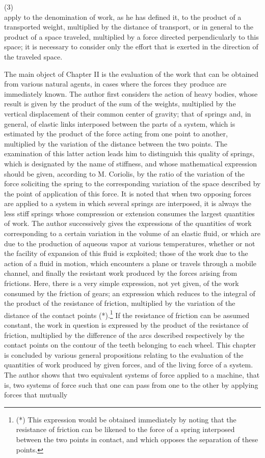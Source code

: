 \documentclass{book}
\begin{document}
\newpage
(3)\\
apply to the denomination of work, as he has defined it, to the product of a transported weight, multiplied by the distance of transport, or in general to the product of a space traveled, multiplied by a force directed perpendicularly to this space; it is necessary to consider only the effort that is exerted in the direction of the traveled space.

The main object of Chapter II is the evaluation of the work that can be obtained from various natural agents, in cases where the forces they produce are immediately known. The author first considers the action of heavy bodies, whose result is given by the product of the sum of the weights, multiplied by the vertical displacement of their common center of gravity; that of springs and, in general, of elastic links interposed between the parts of a system, which is estimated by the product of the force acting from one point to another, multiplied by the variation of the distance between the two points. The examination of this latter action leads him to distinguish this quality of springs, which is designated by the name of stiffness, and whose mathematical expression should be given, according to M. Coriolis, by the ratio of the variation of the force soliciting the spring to the corresponding variation of the space described by the point of application of this force. It is noted that when two opposing forces are applied to a system in which several springs are interposed, it is always the less stiff springs whose compression or extension consumes the largest quantities of work. The author successively gives the expressions of the quantities of work corresponding to a certain variation in the volume of an elastic fluid, or which are due to the production of aqueous vapor at various temperatures, whether or not the facility of expansion of this fluid is exploited; those of the work due to the action of a fluid in motion, which encounters a plane or travels through a mobile channel, and finally the resistant work produced by the forces arising from frictions. Here, there is a very simple expression, not yet given, of the work consumed by the friction of gears; an expression which reduces to the integral of the product of the resistance of friction, multiplied by the variation of the distance of the contact points (*).\footnote{(*) This expression would be obtained immediately by noting that the resistance of friction can be likened to the force of a spring interposed between the two points in contact, and which opposes the separation of these points.} If the resistance of friction can be assumed constant, the work in question is expressed by the product of the resistance of friction, multiplied by the difference of the arcs described respectively by the contact points on the contour of the teeth belonging to each wheel. This chapter is concluded by various general propositions relating to the evaluation of the quantities of work produced by given forces, and of the living force of a system. The author shows that two equivalent systems of force applied to a machine, that is, two systems of force such that one can pass from one to the other by applying forces that mutually 
\end{document}
